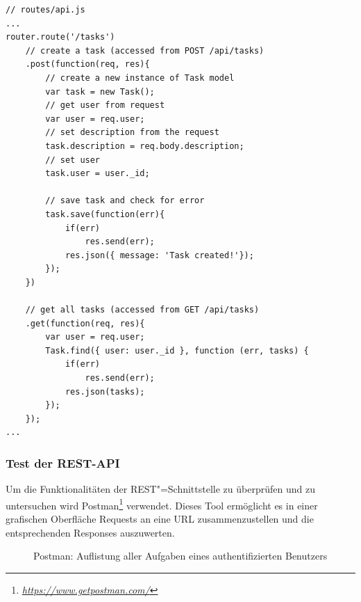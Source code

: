 \begin{lstlisting}[caption={Verbindung zur Datenbank konfigurieren},label={lst_realisierung_router}, frame=single]
// routes/api.js 
...
router.route('/tasks')
    // create a task (accessed from POST /api/tasks)
    .post(function(req, res){
        // create a new instance of Task model
        var task = new Task();                      
        // get user from request
        var user = req.user;                        
        // set description from the request
        task.description = req.body.description; 
        // set user   
        task.user = user._id;
        
        // save task and check for error
        task.save(function(err){
            if(err)
                res.send(err);
            res.json({ message: 'Task created!'});
        });
    })

    // get all tasks (accessed from GET /api/tasks)
    .get(function(req, res){
        var user = req.user;                  
        Task.find({ user: user._id }, function (err, tasks) {
            if(err)
                res.send(err);
            res.json(tasks);
        });
    });
...
\end{lstlisting}

\newpage
\subsubsection{Test der REST-API}

Um die Funktionalitäten der REST"=Schnittstelle zu überprüfen und zu untersuchen wird Postman\footnote{\textit{\url{https://www.getpostman.com/}}} verwendet. Dieses Tool ermöglicht es in einer grafischen Oberfläche Requests an eine URL zusammenzustellen und die entsprechenden Responses auszuwerten. \\

\begin{figure}[htp] 
\caption{Postman: \glqq Auflistung aller Aufgaben eines authentifizierten Benutzers\grqq}
\label{image_implementierung_postman}
\end{figure} 

